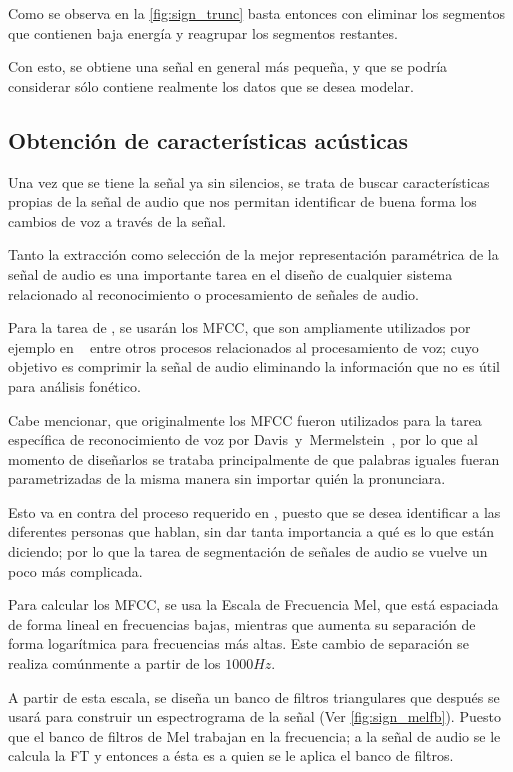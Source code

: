 Como se observa en la \autoref{fig:sign_trunc} basta entonces con eliminar los segmentos que contienen baja energía y reagrupar los segmentos restantes.

Con esto, se obtiene una señal en general más pequeña, y que se podría  considerar sólo contiene realmente los datos que se desea modelar.

\subsection{Obtención de características acústicas}

Una vez que se tiene la señal ya sin silencios, se trata de buscar características propias de la señal de audio que nos permitan identificar de buena forma los cambios de voz a través de la señal.

Tanto la extracción como selección de la mejor representación paramétrica de la señal de audio es una importante tarea en el diseño de cualquier sistema relacionado al reconocimiento o procesamiento de señales de audio. 

Para la tarea de \sd, se usarán los \ac{MFCC}, que son ampliamente utilizados por ejemplo en \sd~ entre otros procesos relacionados al procesamiento de voz; cuyo objetivo es comprimir la señal de audio eliminando la información que no es útil para análisis fonético.

Cabe mencionar, que originalmente los \ac{MFCC} fueron utilizados para la tarea específica de reconocimiento de voz por Davis~y~Mermelstein~\cite{Davis1980}, por lo que al momento de diseñarlos se trataba principalmente de que palabras iguales fueran parametrizadas de la misma manera sin importar quién la pronunciara. 

Esto va en contra del proceso requerido en \sd, puesto que se desea identificar a las diferentes personas que hablan, sin dar tanta importancia a qué es lo que están diciendo; por lo que la tarea de segmentación de señales de audio se vuelve un poco más complicada.

Para calcular los \ac{MFCC}, se usa la Escala de Frecuencia Mel, que está espaciada de forma lineal en frecuencias bajas, mientras que aumenta su separación de forma logarítmica para frecuencias más altas. Este cambio de separación se realiza comúnmente a partir de los $1000Hz$. 

A partir de esta escala, se diseña un banco de filtros triangulares que después se usará para construir un espectrograma de la señal (Ver \autoref{fig:sign_melfb}). Puesto que el banco de filtros de Mel trabajan en la frecuencia; a la señal de audio se le calcula la \ac{FT} y entonces a ésta es a quien se le aplica el banco de filtros.

